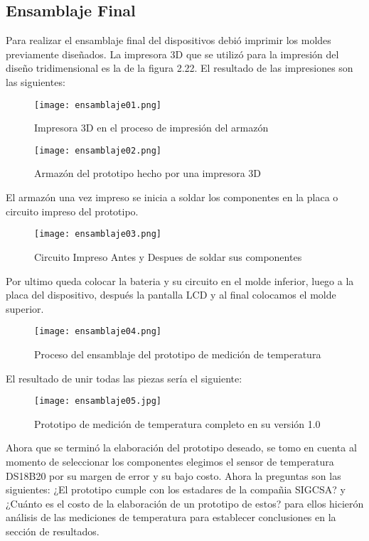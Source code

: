 \subsection{Ensamblaje Final}

\par \noindent
Para realizar el ensamblaje final del dispositivos debió imprimir los moldes previamente diseñados. La impresora 3D que se utilizó para la impresión del diseño tridimensional es la de la figura 2.22. El resultado de las impresiones son las siguientes:

\begin{figure}[H]
	\centering
	\texttt{[image: ensamblaje01.png]}
	\caption{Impresora 3D en el proceso de impresión del armazón}
\end{figure}

\begin{figure}[H]
	\centering
	\texttt{[image: ensamblaje02.png]}
	\caption{Armazón del prototipo hecho por una impresora 3D}
\end{figure}

\par \noindent
El armazón una vez impreso se inicia a soldar los componentes en la placa o circuito impreso del prototipo.

\begin{figure}[H]
	\centering
	\texttt{[image: ensamblaje03.png]}
	\caption{Circuito Impreso Antes y Despues de soldar sus componentes}
\end{figure}

\par \noindent
Por ultimo queda colocar la bateria y su circuito en el molde inferior, luego a la placa del dispositivo, después la pantalla LCD y al final colocamos el molde superior.

\begin{figure}[H]
	\centering
	\texttt{[image: ensamblaje04.png]}
	\caption{Proceso del ensamblaje del prototipo de medición de temperatura}
\end{figure}

\par \noindent
El resultado de unir todas las piezas sería el siguiente:

\begin{figure}[H]
	\centering
	\texttt{[image: ensamblaje05.jpg]}
	\caption{Prototipo de medición de temperatura completo en su versión 1.0}
\end{figure}

\par \noindent
Ahora que se terminó la elaboración del prototipo deseado, se tomo en cuenta al momento de seleccionar los componentes elegimos el sensor de temperatura DS18B20 por su margen de error y su bajo costo. Ahora la preguntas son las siguientes: ¿El prototipo cumple con los estadares de la compañia SIGCSA? y ¿Cuánto es el costo de la elaboración de un prototipo de estos? para ellos hicierón análisis de las mediciones de temperatura para establecer conclusiones en la sección de resultados.